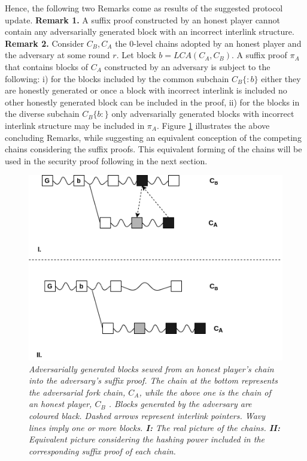 \documentclass[11pt,a4paper]{article}
\begin{document}
Hence, the following two Remarks come as results of the suggested protocol update.
\textbf{Remark 1.} A suffix proof constructed by an honest player cannot contain any adversarially generated block with an incorrect interlink structure.
\textbf{Remark 2.} Consider $C_B, C_A$ the 0-level chains adopted by an honest player and the adversary at some round $r$. Let block $b = LCA(C_A, C_B)$. A suffix proof $\pi_A$ that contains blocks of $C_A$ constructed by an adversary is subject to the following: i) for the blocks included by the common subchain $C_B\{:b\}$ either they are honestly generated or once a block with incorrect interlink is included no other honestly generated block can be included in the proof, ii) for the blocks in the diverse subchain $C_B\{b:\}$ only adversarially generated blocks with incorrect interlink structure may be included in $\pi_A$.
Figure \ref{fig:injection} illustrates the above concluding Remarks, while suggesting an equivalent conception of the competing chains considering the suffix proofs. This equivalent forming of the chains will be used in the security proof following in the next section. 
\begin{figure}[h!]
	\begin{center}
		\includegraphics[scale=0.6]{figures/injection.png}
	\end{center}
	\caption{\textit{Adversarially generated blocks sewed from an honest player's chain into the adversary's suffix proof. The chain at the bottom represents the adversarial fork chain, $C_A$, while the above one is the chain of an honest player, $C_B$ . Blocks generated by the adversary are coloured black. Dashed arrows represent interlink pointers. Wavy lines imply one or more blocks. \textbf{I:} The real picture of the chains. \textbf{II:} Equivalent picture considering the hashing power included in the corresponding suffix proof of each chain.}}
	\label{fig:injection}
\end{figure}
\end{document}
